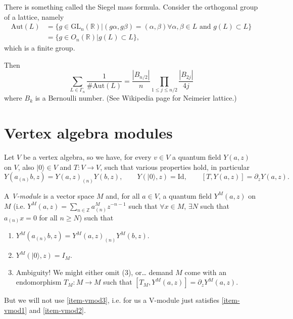 \medskip\noindent
There is something called the Siegel mass formula.
Consider the orthogonal group of a lattice, namely
\begin{align*}
\text{Aut}(L)&=\{g \in \text{GL}_n(\mathbb{R})
|(g \alpha,g \beta)=(\alpha,\beta)\forall \alpha,\beta \in L\text{ and }
g(L) \subset L\}\\
&=\{g \in O_n(\mathbb{R})|g(L) \subset L\},
\end{align*}
which is a finite group.

Then
$$
\sum_{L \in \Gamma_n}\frac{1}{\# \text{Aut}(L)}
=\frac{|B_{n/2}|}{n}
\prod_{1 \leq j \leq  n/2}\frac{|B_{2j}|}{4j}
$$
where $B_k$ is a Bernoulli number.
(See Wikipedia page for Neimeier lattice.)



\section{Vertex algebra modules}
\label{section-vertex-algebra-modules}

\noindent
Let $V$ be a vertex algebra, so we have,
for every $v \in V$ a quantum field
$Y(a,z)$ on $V$, also $|0\rangle \in V$ 
and $T:V \to V$,
such that various properties hold,
in particular
$$
Y(a_{(n)}b,z)=Y(a,z)_{(n)}Y(b,z),\qquad Y(|0\rangle,z)=\text{Id},
\qquad [T,Y(a,z)]=\partial_zY(a,z).
$$

\begin{definition}
\label{definition-v-module}
A {\it V-module} is a vector space $M$ and,
for all $a \in V$, a quantum field $Y^M(a,z)$ on $M$
(i.e. $Y^M(a,z)=\sum_{n \in \mathbb{Z}}a^M_{(n)}z^{-n-1}$ 
such that $\forall x \in M$, $\exists N$
such that $a_{(n)}x=0$ for all $n \geq N$)
such that
\begin{enumerate}
\item $Y^M(a_{(n)}b,z)=Y^M(a,z)_{(n)}Y^M(b,z)$.
\label{item-vmod1}

\item $Y^M(|0\rangle,z)=I_M$.
\label{item-vmod2}

\item 
\label{item-vmod3}
Ambiguity! We might either omit (3), or…
demand $M$ come with an endomorphism $T_M:M \to M$ such that
$[T_M,Y^M(a,z)]=\partial_z Y^M(a,z)$.
\end{enumerate}
\end{definition}

But we will not use \ref{item-vmod3}, i.e.
for us a V-module just satisfies \ref{item-vmod1} and \ref{item-vmod2}.


